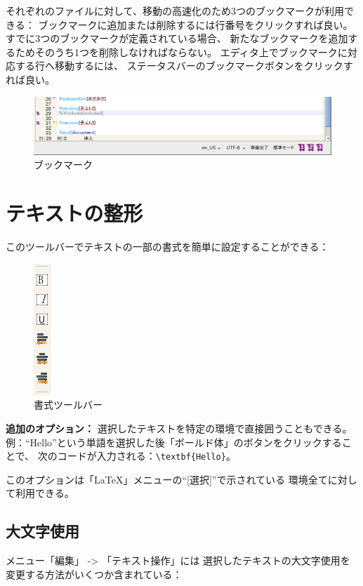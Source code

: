 それぞれのファイルに対して、移動の高速化のため3つのブックマークが利用できる：
ブックマークに追加または削除するには行番号をクリックすれば良い。
すでに3つのブックマークが定義されている場合、
新たなブックマークを追加するためそのうち1つを削除しなければならない。
エディタ上でブックマークに対応する行へ移動するには、
ステータスバーのブックマークボタンをクリックすれば良い。

\begin{figure}[H]
  \centering
  \includegraphics[width=.8\linewidth]{doc20.png}
  \caption{ブックマーク}
\end{figure}

\section{テキストの整形}

このツールバーでテキストの一部の書式を簡単に設定することができる：

\begin{figure}[H]
  \centering
  \includegraphics{doc6.png}
  \caption{書式ツールバー}
\end{figure}

\textbf{追加のオプション：}
選択したテキストを特定の環境で直接囲うこともできる。
例：``Hello''という単語を選択した後「ボールド体」のボタンをクリックすることで、
次のコードが入力される：\verb+\textbf{Hello}+。

このオプションは「LaTeX」メニューの``{[}選択{]}''で示されている
環境全てに対して利用できる。

\subsection{大文字使用}

メニュー「編集」 -\textgreater{} 「テキスト操作」には
選択したテキストの大文字使用を変更する方法がいくつか含まれている：

